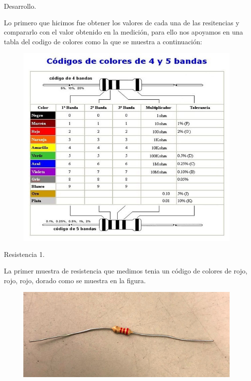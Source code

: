 \documentclass[11pt,a4paper]{report}
\begin{document}
\newpage
	\begin{center}
	\begin{Large}
		Desarrollo.\\
		\vspace{1.5cm}
	\end{Large}
\end{center}
\begin{flushleft}
	Lo primero que hicimos fue obtener los valores de cada una de las resitencias y compararlo con el  valor obtenido en la medici\'on, para ello nos apoyamos en una tabla del codigo de colores como la que se muestra a continuaci\'on:\\
	\vspace{0.5cm}
	\begin{figure}[H]
		\centering
		\includegraphics[width=0.4\linewidth]{bandas}
		\label{fig:bandas}
		\vspace{0.5cm}
	\end{figure}
	
	\begin{large}
		Resistencia 1.\\
	\end{large}
	
	La primer muestra de resistencia que medimos tenia un c\'odigo de colores de rojo, rojo, rojo, dorado como se muestra en la figura.\\
	\begin{figure}[H]
		\centering
		\includegraphics[width=0.4\linewidth]{resistencia1}
		\label{fig:resistencia1}
	\end{figure}
	

\end{flushleft}
\end{document}
